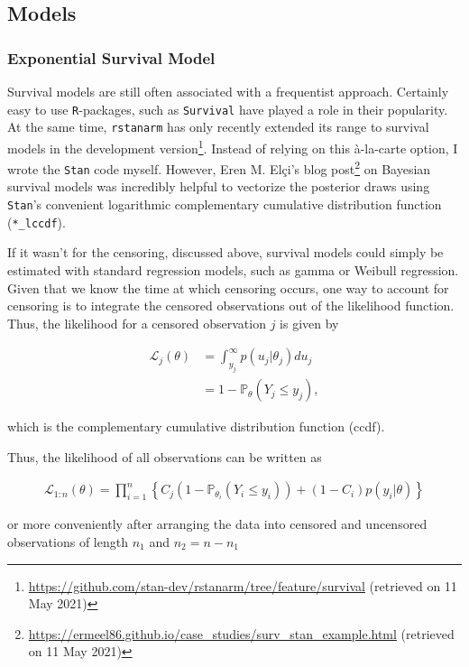 \documentclass[11pt]{article}
\begin{document}
\subsection{Models}
\subsubsection{Exponential Survival Model}
Survival models are still often associated with a frequentist approach. Certainly easy to use \texttt{R}-packages, such as \texttt{Survival} \parencite{Rsurvival2020} have played a role in their popularity. At the same time, \texttt{rstanarm} \parencite{rstanarm2020} has only recently extended its range to survival models in the development version\footnote{\url{https://github.com/stan-dev/rstanarm/tree/feature/survival} (retrieved on 11 May 2021)}. Instead of relying on this à-la-carte option, I wrote the \texttt{Stan} code myself. However, Eren M. Elçi's blog post\footnote{\url{https://ermeel86.github.io/case_studies/surv_stan_example.html} (retrieved on 11 May 2021)} on Bayesian survival models was incredibly helpful to vectorize the posterior draws using \texttt{Stan}'s convenient logarithmic complementary cumulative distribution function (\texttt{*\_lccdf}).

If it wasn't for the censoring, discussed above, survival models could simply be estimated with standard regression models, such as gamma or Weibull regression. Given that we know the time at which censoring occurs, one way to account for censoring is to integrate the censored observations out of the likelihood function. Thus, the likelihood for a censored observation $j$ is given by 

\begin{align*}
\mathcal{L}_j (\theta) &= \int_{y_j}^{\infty} p(u_j|\theta_j) du_j \\
&= 1-\mathbb{P}_\theta(Y_j \leq y_j),
\end{align*}

which is the complementary cumulative distribution function (ccdf).

Thus, the likelihood of all observations can be written as 

\begin{align*}
    \mathcal{L}_{1:n}(\theta) = \prod_{i = 1}^n \left\{C_j (1-\mathbb{P}_{\theta_i}(Y_i \leq y_i)) + (1-C_i) p(y_i|\theta)\right\}
\end{align*}

or more conveniently after arranging the data into censored and uncensored observations of length $n_1$ and $n_2 = n - n_1$ 
\end{document}
